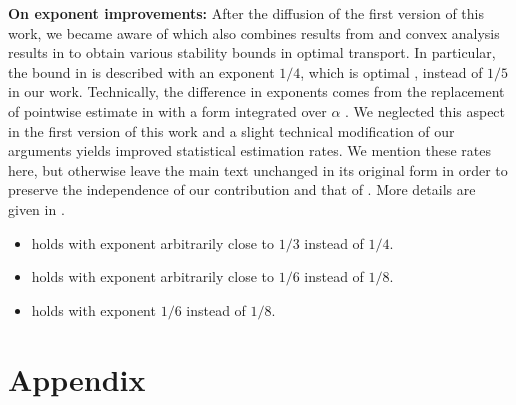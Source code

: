 \documentclass[11pt]{article}
\newcommand{\1}{\mathbbm{1}}
\numberwithin{equation}{section}
\begin{document}
\textbf{On exponent improvements:} After the diffusion of the first version of this work, we became aware of \cite{merigot2026sharp} which also combines results from  \cite{carlier2025quantitative} and convex analysis results in \cite{carlier2023fenchel} to obtain various stability bounds in optimal transport. In particular, the bound in  is described with an exponent $1/4$, which is optimal \cite{letrouit2025unstable}, instead of $1/5$ in our work. Technically, the difference in exponents comes from the replacement of pointwise estimate in  with a form integrated over $\alpha$ \cite[Corollary 2.2]{carlier2025quantitative}. We neglected this aspect in the first version of this work and a slight technical modification of our arguments yields improved statistical estimation rates. We mention these rates here, but otherwise leave the main text unchanged in its original form in order to preserve the independence of our contribution and that of \cite{merigot2026sharp}. More details are given in .
\begin{itemize}
	\item {}  holds with exponent arbitrarily close to $1/3$ instead of $1/4$. 
    \item  {} holds with exponent arbitrarily close to $1/6$ instead of $1/8$.
    
	\item {} holds with exponent $1/6$ instead of $1/8$.
\end{itemize}




\appendix
\section{Appendix}
\end{document}
